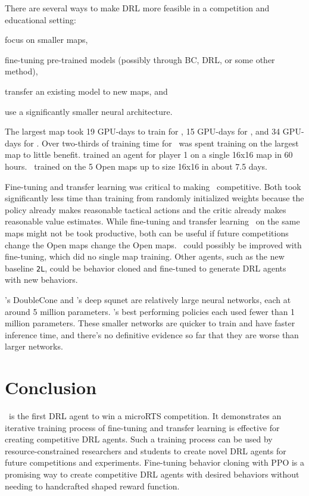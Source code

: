 \documentclass{article}
\begin{document}
There are several ways to make DRL more feasible in a competition and educational setting:
\begin{inparaenum}[(1)]
    \item focus on smaller maps,
    \item fine-tuning pre-trained models (possibly through BC, DRL, or some other method),
    \item transfer an existing model to new maps, and
    \item use a significantly smaller neural architecture.
\end{inparaenum}
The largest map took 19 GPU-days to train for \agentName, 15 GPU-days for \bcAgent, and
34 GPU-days for \bcPPOAgent. Over two-thirds of training time for \bcPPOAgent\ was spent
training on the largest map to little benefit. \citet{DBLP:journals/corr/abs-2105-13807}
trained an agent for player 1 on a single 16x16 map in 60 hours. \bcPPOAgent\ trained
on the 5 Open maps up to size 16x16 in about 7.5 days.

Fine-tuning and transfer learning was critical to making \agentName\ competitive. Both
took significantly less time than training from randomly initialized weights because the
policy already makes reasonable tactical actions and the critic already makes
reasonable value estimates.  While fine-tuning and transfer learning \agentName\ on the same maps
might not be took productive, both can be useful if future competitions change the Open
maps change the Open maps. \bcPPOAgent\ could possibly be improved with fine-tuning,
which did no single map training. Other agents, such as the new baseline \texttt{2L}, 
could be behavior cloned and fine-tuned to generate DRL agents with new behaviors.

\agentName's DoubleCone and \bcPPOAgent's deep squnet are relatively large neural
networks, each at around 5 million parameters.
\citet{DBLP:journals/corr/abs-2105-13807}'s best performing policies each used fewer
than 1 million parameters. These smaller networks are quicker to train and have faster
inference time, and there's no definitive evidence so far that they are worse than
larger networks.

\section{Conclusion}
\agentName\ is the first DRL agent to win a microRTS competition. It demonstrates an
iterative training process of fine-tuning and transfer learning is effective for
creating competitive DRL agents. Such a training process can be used by 
resource-constrained researchers and students to create novel DRL agents for future 
competitions and experiments. Fine-tuning behavior cloning with PPO is a promising way
to create competitive DRL agents with desired behaviors without needing to handcrafted
shaped reward function.
\end{document}

